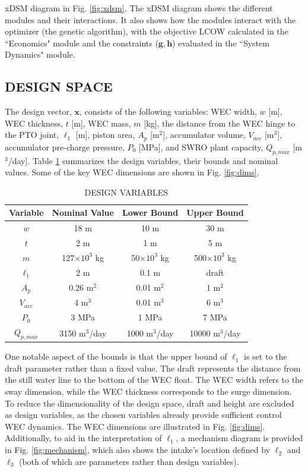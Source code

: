\documentclass[twocolumn,10pt]{asme2e}
\begin{document}
\FloatBarrier

\noindent xDSM diagram \cite{xdsm} in Fig. \ref{fig:xdsm}. The xDSM diagram shows the different modules and their interactions. It also shows how the modules interact with the optimizer (the genetic algorithm), with the objective LCOW calculated in the ``Economics" module and the constraints ($\mathbf{g},\mathbf{h}$) evaluated in the ``System Dynamics" module.

\subsection{DESIGN SPACE}
The design vector, $\mathbf{x}$, consists of the following variables: WEC width, $w$ [m], WEC thickness, $t$ [m], WEC mass, $m$ [kg], the distance from the WEC hinge to the PTO joint, $\ell_1$ [m], piston area, $A_p$ [m$^2$], accumulator volume, $V_{acc}$ [m$^3$], accumulator pre-charge pressure, $P_0$ [MPa], and SWRO plant capacity, $Q_{p,max}$ [m$^3$/day]. Table \ref{tab:design_space} summarizes the design variables, their bounds and nominal values. Some of the key WEC dimensions are shown in Fig. \ref{fig:dims}.
\begin{table}[h]
    \centering
    \caption{DESIGN VARIABLES}
    \begin{tabular}{cccc}
        \hline
        Variable & Nominal Value & Lower Bound & Upper Bound\\
        \hline
        $w$ & 18 m & 10 m & 30 m \\
        $t$ & 2 m & 1 m & 5 m \\
        $m$ & 127$\times10^3$ kg & 50$\times10^3$ kg & 500$\times10^3$ kg \\
        $\ell_1$ & 2 m & 0.1 m & draft \\
        $A_p$ & 0.26 m$^2$ & 0.01 m$^2$ & 1 m$^2$ \\
        $V_{acc}$ & 4 m$^3$ & 0.01 m$^3$ & 6 m$^3$ \\
        $P_0$ & 3 MPa & 1 MPa & 7 MPa \\
        $Q_{p,max}$ & 3150 m$^3$/day & 1000 m$^3$/day & 10000 m$^3$/day\\
        \hline
    \end{tabular}
    \label{tab:design_space} 
\end{table}

One notable aspect of the bounds is that the upper bound of $\ell_1$ is set to the draft parameter rather than a fixed value. The draft represents the distance from the still water line to the bottom of the WEC float. The WEC width refers to the sway dimension, while the WEC thickness corresponds to the surge dimension. To reduce the dimensionality of the design space, draft and height are excluded as design variables, as the chosen variables already provide sufficient control WEC dynamics. The WEC dimensions are illustrated in Fig. \ref{fig:dims}. Additionally, to aid in the interpretation of $\ell_1$, a mechanism diagram is provided in Fig. \ref{fig:mechanism}, which also shows the intake's location defined by $\ell_2$ and $\ell_3$ (both of which are parameters rather than design variables).
\end{document}
